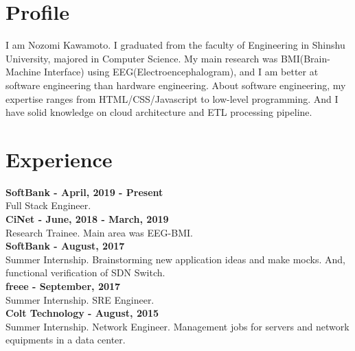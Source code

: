 \documentclass[10pt]{article} %
\begin{document}
\begin{paracol}{2}
\switchcolumn %

\section{Profile}
I am Nozomi Kawamoto. I graduated from the faculty of Engineering in Shinshu University, majored in Computer Science. 
My main research was BMI(Brain-Machine Interface) using EEG(Electroencephalogram), and I am better at software engineering than hardware engineering.
About software engineering, my expertise ranges from HTML/CSS/Javascript to low-level programming. And I have solid knowledge on cloud architecture and ETL processing pipeline. 

\vspace{3cm}

\section{Experience}
\textbf{\color{subtitle}SoftBank - April, 2019 - Present}\\
Full Stack Engineer.\\

\textbf{\color{subtitle}CiNet - June, 2018 - March, 2019}\\
Research Trainee. Main area was EEG-BMI.\\

\textbf{\color{subtitle}SoftBank - August, 2017}\\
Summer Internship. Brainstorming new application ideas and make mocks. And, functional verification of SDN Switch.\\

\textbf{\color{subtitle}freee - September, 2017}\\
Summer Internship. SRE Engineer.\\

\textbf{\color{subtitle}Colt Technology - August, 2015}\\
Summer Internship. Network Engineer. Management jobs for servers and network equipments in a data center.\\

\vspace{3cm}


\end{paracol}
\end{document}

